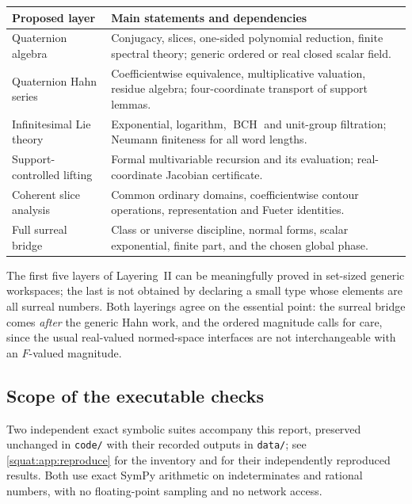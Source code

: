 \documentclass[11pt,letterpaper]{article}
\numberwithin{equation}{section}
\theoremstyle{definition}
\theoremstyle{remark}
\newcommand{\BCH}{\operatorname{BCH}}
\begin{document}
\begin{center}\small
\begin{tabular}{L{0.30\textwidth}L{0.62\textwidth}}
\toprule
Proposed layer & Main statements and dependencies\\
\midrule
Quaternion algebra & Conjugacy, slices, one-sided polynomial reduction, finite spectral
theory; generic ordered or real closed scalar field.\\
Quaternion Hahn series & Coefficientwise equivalence, multiplicative valuation, residue
algebra; four-coordinate transport of support lemmas.\\
Infinitesimal Lie theory & Exponential, logarithm, $\BCH$ and unit-group filtration;
Neumann finiteness for all word lengths.\\
Support-controlled lifting & Formal multivariable recursion and its evaluation;
real-coordinate Jacobian certificate.\\
Coherent slice analysis & Common ordinary domains, coefficientwise contour operations,
representation and Fueter identities.\\
Full surreal bridge & Class or universe discipline, normal forms, scalar exponential,
finite part, and the chosen global phase.\\
\bottomrule
\end{tabular}
\end{center}

\noindent The first five layers of Layering~II can be meaningfully proved in set-sized
generic workspaces; the last is not obtained by declaring a small type whose elements are
all surreal numbers. Both layerings agree on the essential point: the surreal bridge comes
\emph{after} the generic Hahn work, and the ordered magnitude calls for care, since the
usual real-valued normed-space interfaces are not interchangeable with an $F$-valued
magnitude.

\subsection{Scope of the executable checks}\label{squat:sub:checks}
Two independent exact symbolic suites accompany this report, preserved unchanged in
\texttt{code/} with their recorded outputs in \texttt{data/}; see
\cref{squat:app:reproduce} for the inventory and for their independently reproduced
results. Both use exact SymPy arithmetic on indeterminates and rational numbers, with no
floating-point sampling and no network access.
\end{document}
